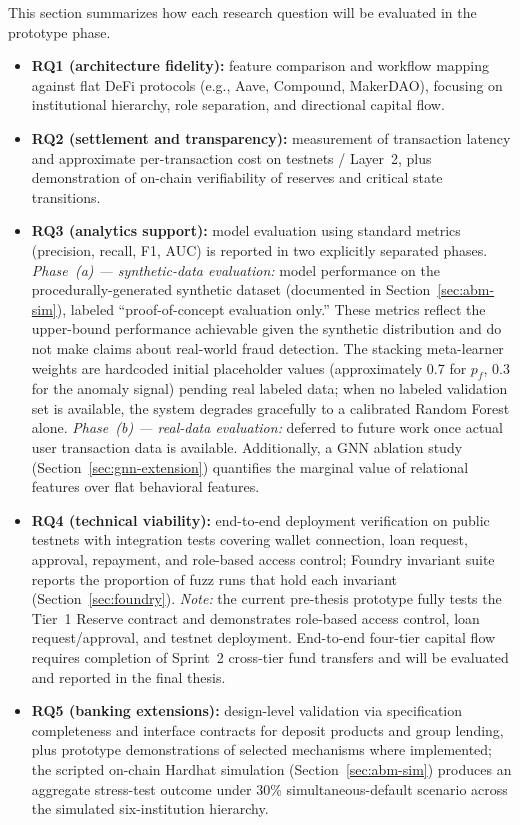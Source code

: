 \documentclass[12pt,a4paper]{report}
\begin{document}
This section summarizes how each research question will be evaluated in the prototype phase.
\begin{itemize}[noitemsep]
\item \textbf{RQ1 (architecture fidelity):} feature comparison and workflow mapping against flat DeFi protocols (e.g., Aave, Compound, MakerDAO), focusing on institutional hierarchy, role separation, and directional capital flow.
\item \textbf{RQ2 (settlement and transparency):} measurement of transaction latency and approximate per-transaction cost on testnets / Layer~2, plus demonstration of on-chain verifiability of reserves and critical state transitions.
\item \textbf{RQ3 (analytics support):} model evaluation using standard metrics (precision, recall, F1, AUC) is reported in two explicitly separated phases. \textit{Phase~(a) --- synthetic-data evaluation:} model performance on the procedurally-generated synthetic dataset (documented in Section~\ref{sec:abm-sim}), labeled ``proof-of-concept evaluation only.'' These metrics reflect the upper-bound performance achievable given the synthetic distribution and do not make claims about real-world fraud detection. The stacking meta-learner weights are hardcoded initial placeholder values (approximately 0.7 for $p_f$, 0.3 for the anomaly signal) pending real labeled data; when no labeled validation set is available, the system degrades gracefully to a calibrated Random Forest alone. \textit{Phase~(b) --- real-data evaluation:} deferred to future work once actual user transaction data is available. Additionally, a GNN ablation study (Section~\ref{sec:gnn-extension}) quantifies the marginal value of relational features over flat behavioral features.
\item \textbf{RQ4 (technical viability):} end-to-end deployment verification on public testnets with integration tests covering wallet connection, loan request, approval, repayment, and role-based access control; Foundry invariant suite reports the proportion of fuzz runs that hold each invariant (Section~\ref{sec:foundry}). \textit{Note:} the current pre-thesis prototype fully tests the Tier~1 Reserve contract and demonstrates role-based access control, loan request/approval, and testnet deployment. End-to-end four-tier capital flow requires completion of Sprint~2 cross-tier fund transfers and will be evaluated and reported in the final thesis.
\item \textbf{RQ5 (banking extensions):} design-level validation via specification completeness and interface contracts for deposit products and group lending, plus prototype demonstrations of selected mechanisms where implemented; the scripted on-chain Hardhat simulation (Section~\ref{sec:abm-sim}) produces an aggregate stress-test outcome under 30\% simultaneous-default scenario across the simulated six-institution hierarchy.
\end{itemize}
\end{document}
